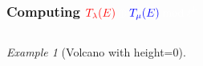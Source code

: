 \documentclass[10pt,a4paper]{beamer}
\theoremstyle{plain}
\theoremstyle{definition}
\theoremstyle{definition}
\theoremstyle{definition}
\theoremstyle{definition}
\theoremstyle{remark}
\theoremstyle{remark}
\newtheorem{exe}[thm]{Example}
\begin{document}
%
%

\begin{frame}
\frametitle{Computing $\color{red}T_{\lambda}(E) \color{white} \oplus \color{blue} T_{\mu}(E) \color{white} \bmod \ell^k $}
\begin{columns}
\begin{column}{6cm}
\begin{exe}[Volcano with height=0]
\end{exe}
\end{column}
\end{columns}
\end{frame}
\end{document}
